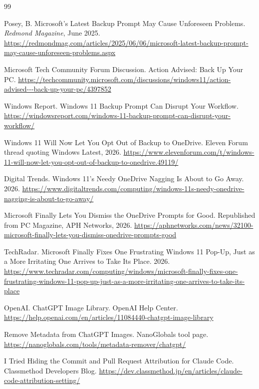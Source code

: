 \documentclass[11pt]{article}
\begin{document}
\clearpage
\begin{thebibliography}{99}
\raggedright

 Posey, B. Microsoft's Latest Backup Prompt May Cause Unforeseen Problems. \emph{Redmond Magazine}, June 2025. \url{https://redmondmag.com/articles/2025/06/06/microsoft-latest-backup-prompt-may-cause-unforeseen-problems.aspx}

 Microsoft Tech Community Forum Discussion. Action Advised: Back Up Your PC. \url{https://techcommunity.microsoft.com/discussions/windows11/action-advised---back-up-your-pc/4397852}

 Windows Report. Windows 11 Backup Prompt Can Disrupt Your Workflow. \url{https://windowsreport.com/windows-11-backup-prompt-can-disrupt-your-workflow/}

 Windows 11 Will Now Let You Opt Out of Backup to OneDrive. Eleven Forum thread quoting Windows Latest, 2026. \url{https://www.elevenforum.com/t/windows-11-will-now-let-you-opt-out-of-backup-to-onedrive.49119/}

 Digital Trends. Windows 11's Needy OneDrive Nagging Is About to Go Away. 2026. \url{https://www.digitaltrends.com/computing/windows-11s-needy-onedrive-nagging-is-about-to-go-away/}

 Microsoft Finally Lets You Dismiss the OneDrive Prompts for Good. Republished from PC Magazine, APH Networks, 2026. \url{https://aphnetworks.com/news/32100-microsoft-finally-lets-you-dismiss-onedrive-prompts-good}

 TechRadar. Microsoft Finally Fixes One Frustrating Windows 11 Pop-Up, Just as a More Irritating One Arrives to Take Its Place. 2026. \url{https://www.techradar.com/computing/windows/microsoft-finally-fixes-one-frustrating-windows-11-pop-up-just-as-a-more-irritating-one-arrives-to-take-its-place}

 OpenAI. ChatGPT Image Library. OpenAI Help Center. \url{https://help.openai.com/en/articles/11084440-chatgpt-image-library}

 Remove Metadata from ChatGPT Images. NanoGlobals tool page. \url{https://nanoglobals.com/tools/metadata-remover/chatgpt/}

 I Tried Hiding the Commit and Pull Request Attribution for Claude Code. Classmethod Developers Blog. \url{https://dev.classmethod.jp/en/articles/claude-code-attribution-setting/}


\end{thebibliography}
\end{document}
